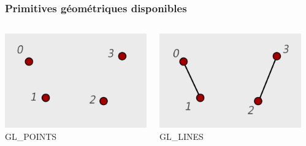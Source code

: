 \documentclass{beamer}
\begin{document}
\begin{frame}
\frametitle{Primitives géométriques disponibles}
\begin{columns}
	\begin{column}{0.3\textwidth}
		\centering		
		\includegraphics[width=\textwidth]{img/GL_POINTS}
		\\ { GL\_POINTS}
	\end{column}
	\begin{column}{0.3\textwidth}
		\centering	
		\includegraphics[width=\textwidth]{img/GL_LINES}
		\\ { GL\_LINES}
	\end{column}
	\begin{column}{0.3\textwidth}

\end{column}
\end{columns}
\end{frame}
\end{document}
